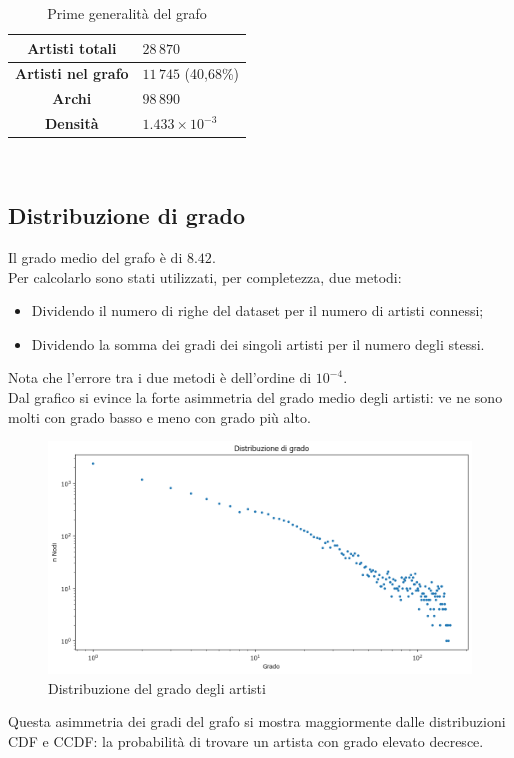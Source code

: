 \documentclass[sigchi]{acmart}
\begin{document}
\begin{table}[H]
\centering
\begin{tabular}{|c|>{\raggedright\arraybackslash}p{4cm}|}
\hline
\textbf{Artisti totali} &
$ 28\,870 $ \\
\hline
\textbf{Artisti nel grafo} &
$ 11\,745 $ (40,68\%)  \\
\hline
\textbf{Archi} &
$ 98\,890 $ \\
\hline
\textbf{Densità} &
$ 1.433 \times 10^{-3} $ \\
\hline
\end{tabular}\\[15pt]
\caption{Prime generalità del grafo}
\end{table}

\subsection{Distribuzione di grado}

Il grado medio del grafo è di $ 8.42 $. \\ Per calcolarlo sono stati utilizzati, per completezza, due metodi:

\begin{itemize}
\item Dividendo il numero di righe del dataset per il numero di artisti connessi;
\item Dividendo la somma dei gradi dei singoli artisti per il numero degli stessi.
\end{itemize}
Nota che l'errore tra i due metodi è dell'ordine di $ 10^{-4} $. \\ Dal grafico si evince la forte asimmetria del grado medio degli artisti: ve ne sono molti con grado basso e meno con grado più alto.

\begin{figure}[H]
\centering
\includegraphics[width=0.45
\textwidth]{../network_analysis/plots/2_2/grDist.png}
\caption{Distribuzione del grado degli artisti}
\label{fig:plotDist}
\end{figure}

Questa asimmetria dei gradi del grafo si mostra maggiormente dalle distribuzioni CDF e CCDF: la probabilità di trovare un artista con grado elevato decresce.
\end{document}

